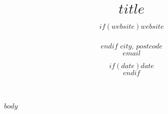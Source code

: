 \documentclass[11pt, a4paper]{article}
\title{$title$} %
\date{$if(date)$$date$\\$endif$} %
\author{$if(website)$$website$\\\\$endif$
$city$, $postcode$\\ %
$email$ } %
\begin{document}
\maketitle
\begin{raggedright}
	\justify
$body$
\end{raggedright}
\end{document}
